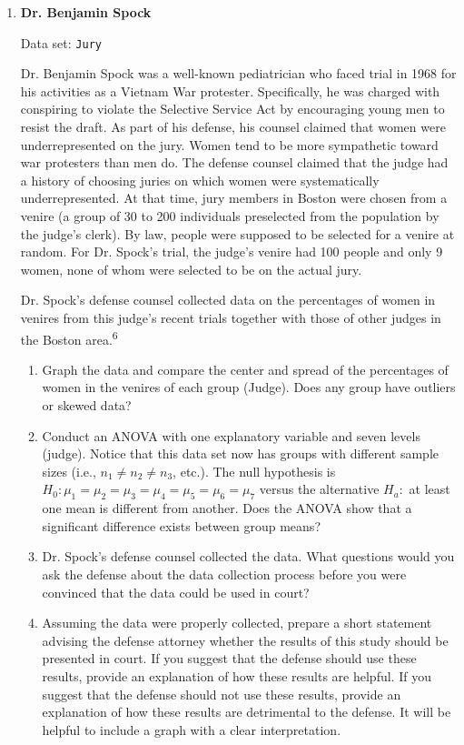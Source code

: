 \documentclass[
]{report}
\begin{document}
\begin{enumerate}
  \item \textbf{Dr. Benjamin Spock}

Data set: \texttt{Jury}

Dr. Benjamin Spock was a well-known pediatrician who faced trial in 1968 for his activities as a Vietnam War protester. Specifically, he was charged with conspiring to violate the Selective Service Act by encouraging young men to resist the draft. As part of his defense, his counsel claimed that women were underrepresented on the jury. Women tend to be more sympathetic toward war protesters than men do. The defense counsel claimed that the judge had a history of choosing juries on which women were systematically underrepresented. At that time, jury members in Boston were chosen from a venire (a group of 30 to 200 individuals preselected from the population by the judge’s clerk). By law, people were supposed to be selected for a venire at random. For Dr. Spock’s trial, the judge’s venire had 100 people and only 9 women, none of whom were selected to be on the actual jury.

Dr. Spock’s defense counsel collected data on the percentages of women in venires from this judge’s recent trials together with those of other judges in the Boston area.\textsuperscript{6}

  \begin{enumerate}
    \item Graph the data and compare the center and spread of the percentages of women in the venires of each group (Judge). Does any group have outliers or skewed data?
      \item Conduct an ANOVA with one explanatory variable and seven levels (judge). Notice that this data set now has groups with different sample sizes (i.e., $\scriptstyle n_1 \ne n_2 \ne n_3$, etc.). The null hypothesis is $\scriptstyle H_0\colon \mu_1 = \mu_2 = \mu_3 = \mu_4 = \mu_5 = \mu_6 = \mu_7$ versus the alternative $\scriptstyle H_a\colon$ at least one mean is different from another. Does the ANOVA show that a significant difference exists between group means?
      \item Dr. Spock’s defense counsel collected the data. What questions would you ask the defense about the data collection process before you were convinced that the data could be used in court?
      \item Assuming the data were properly collected, prepare a short statement advising the defense attorney whether the results of this study should be presented in court. If you suggest that the defense should use these results, provide an explanation of how these results are helpful. If you suggest that the defense should not use these results, provide an explanation of how these results are detrimental to the defense. It will be helpful to include a graph with a clear interpretation.
    \end{enumerate}


\end{enumerate}
\end{document}
